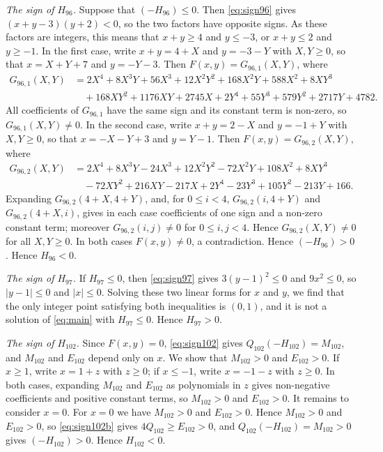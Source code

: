 \documentclass[11pt]{article}
\begin{document}
\emph{The sign of $H_{96}$.} Suppose that $(-H_{96})\leq0$. Then \eqref{eq:sign96} gives $(x+y-3)(y+2)<0$, so the two factors have opposite signs. As these factors are integers, this means that $x+y\geq4$ and $y\leq-3$, or $x+y\leq2$ and $y\geq-1$. In the first case, write $x+y=4+X$ and $y=-3-Y$ with $X,Y\geq0$, so that $x=X+Y+7$ and $y=-Y-3$. Then $F(x,y)=G_{96,1}(X,Y)$, where
\begin{align*}
G_{96,1}(X,Y)&=2X^{4}+8X^{3}Y+56X^{3}+12X^{2}Y^{2}+168X^{2}Y+588X^{2}+8XY^{3}\\
&\quad+168XY^{2}+1176XY+2745X+2Y^{4}+55Y^{3}+579Y^{2}+2717Y+4782.
\end{align*}
All coefficients of $G_{96,1}$ have the same sign and its constant term is non-zero, so $G_{96,1}(X,Y)\neq0$. In the second case, write $x+y=2-X$ and $y=-1+Y$ with $X,Y\geq0$, so that $x=-X-Y+3$ and $y=Y-1$. Then $F(x,y)=G_{96,2}(X,Y)$, where
\begin{align*}
G_{96,2}(X,Y)&=2X^{4}+8X^{3}Y-24X^{3}+12X^{2}Y^{2}-72X^{2}Y+108X^{2}+8XY^{3}\\
&\quad-72XY^{2}+216XY-217X+2Y^{4}-23Y^{3}+105Y^{2}-213Y+166.
\end{align*}
Expanding $G_{96,2}(4+X,4+Y)$, and, for $0\leq i<4$, $G_{96,2}(i,4+Y)$ and $G_{96,2}(4+X,i)$, gives in each case coefficients of one sign and a non-zero constant term; moreover $G_{96,2}(i,j)\neq0$ for $0\leq i,j<4$. Hence $G_{96,2}(X,Y)\neq0$ for all $X,Y\geq0$. In both cases $F(x,y)\neq0$, a contradiction. Hence $(-H_{96})>0$. Hence $H_{96}<0$.

\emph{The sign of $H_{97}$.} If $H_{97}\leq0$, then \eqref{eq:sign97} gives $3(y-1)^2\leq 0$ and $9x^2\leq 0$, so $|y-1|\leq0$ and $|x|\leq0$. Solving these two linear forms for $x$ and $y$, we find that the only integer point satisfying both inequalities is $(0,1)$, and it is not a solution of \eqref{eq:main} with $H_{97}\leq0$. Hence $H_{97}>0$.

\emph{The sign of $H_{102}$.} Since $F(x,y)=0$, \eqref{eq:sign102} gives $Q_{102}(-H_{102})=M_{102}$, and $M_{102}$ and $E_{102}$ depend only on $x$. We show that $M_{102}>0$ and $E_{102}>0$. If $x\geq1$, write $x=1+z$ with $z\geq0$; if $x\leq-1$, write $x=-1-z$ with $z\geq0$. In both cases, expanding $M_{102}$ and $E_{102}$ as polynomials in $z$ gives non-negative coefficients and positive constant terms, so $M_{102}>0$ and $E_{102}>0$. It remains to consider $x=0$. For $x=0$ we have $M_{102}>0$ and $E_{102}>0$. Hence $M_{102}>0$ and $E_{102}>0$, so \eqref{eq:sign102b} gives $4Q_{102}\geq E_{102}>0$, and $Q_{102}(-H_{102})=M_{102}>0$ gives $(-H_{102})>0$. Hence $H_{102}<0$.
\end{document}
